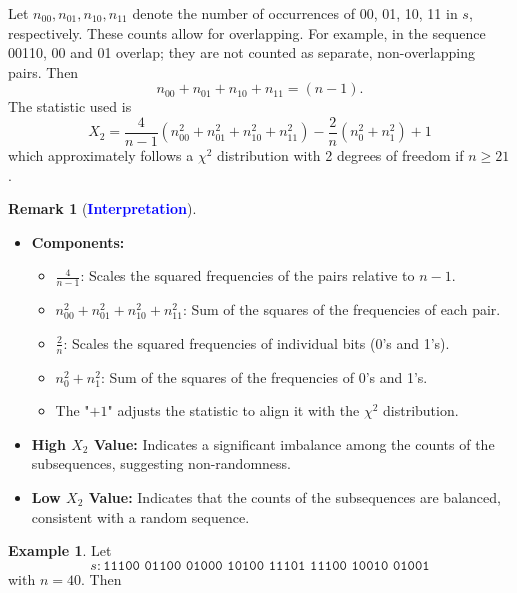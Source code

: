 \documentclass[12pt,openany]{book}
\theoremstyle{definition}
\newtheorem{remark}{Remark}[chapter]
\newtheorem{example}{Example}[chapter]
\begin{document}
\begin{tcolorbox}[colback=white,colframe=lemcolor,arc=5pt,title={\color{white}\bf Two-Bit Test}]
	Let \( n_{00}, n_{01}, n_{10}, n_{11} \) denote the number of occurrences of 00, 01, 10, 11 in \( s \), respectively. These counts allow for overlapping. For example, in the sequence 00110, 00 and 01 overlap; they are not counted as separate, non-overlapping pairs. Then \[
	n_{00} + n_{01} + n_{10} + n_{11} = (n - 1).
	\] The statistic used is
	\[ X_2 = \frac{4}{n-1} (n_{00}^2 + n_{01}^2 + n_{10}^2 + n_{11}^2) - \frac{2}{n} (n_0^2 + n_1^2) + 1 \]
	which approximately follows a \( \chi^2 \) distribution with 2 degrees of freedom if \( n \geq 21 \).
\end{tcolorbox}
\begin{remark}[\textcolor{blue}{\bf Interpretation}]
	\ \begin{itemize}
		\item \textbf{Components:} \begin{itemize}
			\item $\frac{4}{n-1}$: Scales the squared frequencies of the pairs relative to $n-1$.
			\item $n_{00}^2 + n_{01}^2 + n_{10}^2 + n_{11}^2$: Sum of the squares of the frequencies of each pair.
			\item $\frac{2}{n}$: Scales the squared frequencies of individual bits (0's and 1's).
			\item $n_0^2+n_1^2$: Sum of the squares of the frequencies of 0's and 1's.
			\item The "$+1$" adjusts the statistic to align it with the $\chi^2$ distribution.
		\end{itemize} 
		\item \textbf{High $X_2$ Value:} Indicates a significant imbalance among the counts of the subsequences, suggesting non-randomness.
		\item \textbf{Low $X_2$ Value:} Indicates that the counts of the subsequences are balanced, consistent with a random sequence.
	\end{itemize}
\end{remark}
\begin{example}
	Let \[
	s:\texttt{11100 \ 01100 \ 01000 \ 10100 \ 11101 \ 11100 \ 10010 \ 01001}
	\] with $n=40$. Then 
\end{example}
\end{document}
